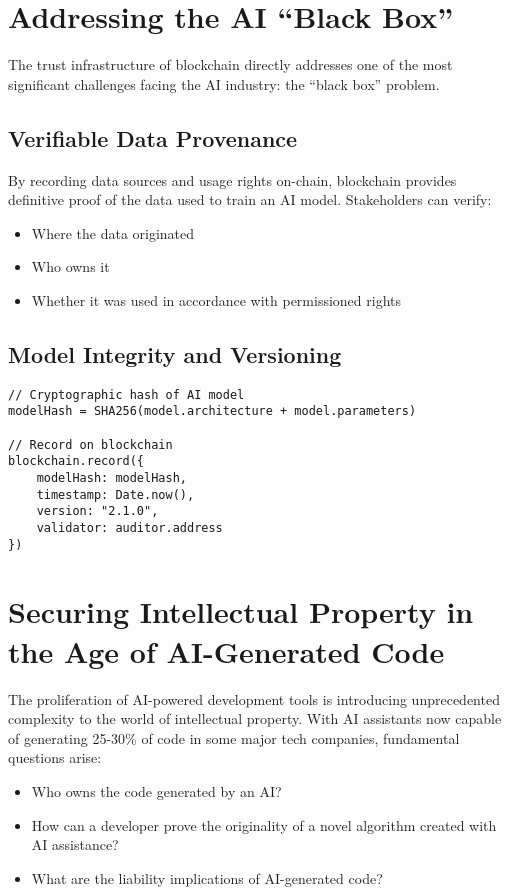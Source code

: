 \documentclass[11pt,a4paper]{report}
\begin{document}
\section{Addressing the AI ``Black Box''}

The trust infrastructure of blockchain directly addresses one of the most significant challenges facing the AI industry: the ``black box'' problem.

\subsection{Verifiable Data Provenance}

By recording data sources and usage rights on-chain, blockchain provides definitive proof of the data used to train an AI model. Stakeholders can verify:
\begin{itemize}
    \item Where the data originated
    \item Who owns it
    \item Whether it was used in accordance with permissioned rights
\end{itemize}

\subsection{Model Integrity and Versioning}

\begin{tcolorbox}[
    colback=lightgray,
    colframe=primaryblue,
    title=Implementation Example,
    fonttitle=\bfseries
]
\begin{verbatim}
// Cryptographic hash of AI model
modelHash = SHA256(model.architecture + model.parameters)

// Record on blockchain
blockchain.record({
    modelHash: modelHash,
    timestamp: Date.now(),
    version: "2.1.0",
    validator: auditor.address
})
\end{verbatim}
\end{tcolorbox}

\section{Securing Intellectual Property in the Age of AI-Generated Code}

The proliferation of AI-powered development tools is introducing unprecedented complexity to the world of intellectual property. With AI assistants now capable of generating 25-30\% of code in some major tech companies, fundamental questions arise:
\begin{keypoint}
\begin{itemize}
    \item Who owns the code generated by an AI?
    \item How can a developer prove the originality of a novel algorithm created with AI assistance?
    \item What are the liability implications of AI-generated code?
\end{itemize}
\end{keypoint}
\end{document}

